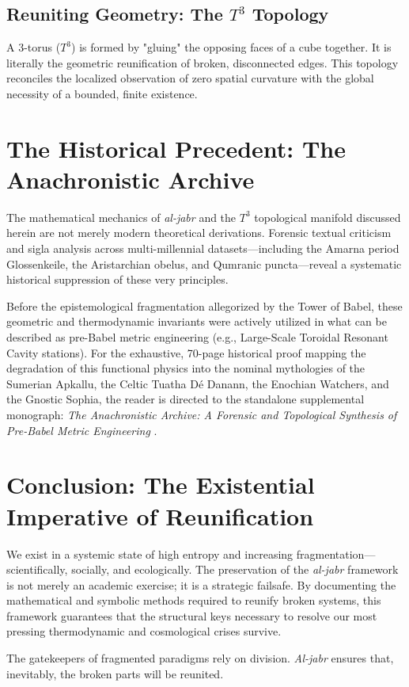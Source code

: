 \documentclass[aps,prd,11pt,onecolumn,superscriptaddress,nofootinbib,floatfix]{revtex4-2}
\begin{document}
\subsection{Reuniting Geometry: The $T^3$ Topology}
A 3-torus ($T^3$) is formed by "gluing" the opposing faces of a cube together. It is literally the geometric reunification of broken, disconnected edges. This topology reconciles the localized observation of zero spatial curvature with the global necessity of a bounded, finite existence. 

\section{The Historical Precedent: The Anachronistic Archive}
\label{sec:historical-precedent}

The mathematical mechanics of \textit{al-jabr} and the $T^3$ topological manifold discussed herein are not merely modern theoretical derivations. Forensic textual criticism and sigla analysis across multi-millennial datasets—including the Amarna period Glossenkeile, the Aristarchian obelus, and Qumranic puncta—reveal a systematic historical suppression of these very principles. 

Before the epistemological fragmentation allegorized by the Tower of Babel, these geometric and thermodynamic invariants were actively utilized in what can be described as pre-Babel metric engineering (e.g., Large-Scale Toroidal Resonant Cavity stations). For the exhaustive, 70-page historical proof mapping the degradation of this functional physics into the nominal mythologies of the Sumerian Apkallu, the Celtic Tuatha Dé Danann, the Enochian Watchers, and the Gnostic Sophia, the reader is directed to the standalone supplemental monograph: \textit{The Anachronistic Archive: A Forensic and Topological Synthesis of Pre-Babel Metric Engineering} \cite{anachronistic_archive}.

\section{Conclusion: The Existential Imperative of Reunification}
\label{sec:conclusion}

We exist in a systemic state of high entropy and increasing fragmentation—scientifically, socially, and ecologically. The preservation of the \textit{al-jabr} framework is not merely an academic exercise; it is a strategic failsafe. By documenting the mathematical and symbolic methods required to reunify broken systems, this framework guarantees that the structural keys necessary to resolve our most pressing thermodynamic and cosmological crises survive. 

The gatekeepers of fragmented paradigms rely on division. \textit{Al-jabr} ensures that, inevitably, the broken parts will be reunited.




\end{document}
